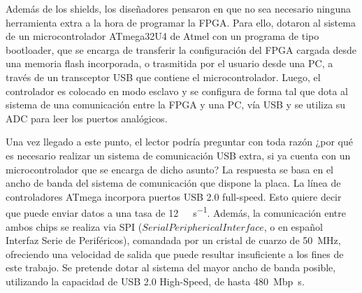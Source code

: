 Además de los shields, los diseñadores pensaron en que no sea necesario ninguna herramienta extra a la hora de programar la FPGA. Para ello, dotaron al sistema de un microcontrolador ATmega32U4 de Atmel con un programa de tipo bootloader, que se encarga de transferir la configuración del FPGA cargada desde una memoria flash incorporada, o trasmitida por el usuario desde una PC, a través de un transceptor USB que contiene el microcontrolador. Luego, el controlador es colocado en modo esclavo y se configura de forma tal que dota al sistema de una comunicación entre la FPGA y una PC, vía USB y se utiliza su ADC para leer los puertos analógicos.%

Una vez llegado a este punto, el lector podría preguntar con toda razón ¿por qué es necesario realizar un sistema de comunicación USB extra, si ya cuenta con un microcontrolador que se encarga de dicho asunto? La respuesta se basa en el ancho de banda del sistema de comunicación que dispone la placa. La línea de controladores ATmega incorpora puertos USB 2.0 full-speed. Esto quiere decir que puede enviar datos a una tasa de \SI{12}{\mega\bit\per\second}. Además, la comunicación entre ambos chips se realiza via SPI (\(Serial Peripherical Interface\), o en español Interfaz Serie de Periféricos), comandada por un cristal de cuarzo de \SI{50}{\mega\hertz}, ofreciendo una velocidad de salida que puede resultar insuficiente a los fines de este trabajo. Se pretende dotar al sistema del mayor ancho de banda posible, utilizando la capacidad de USB 2.0 High-Speed, de hasta \SI{480}{\mega bp\second}.%